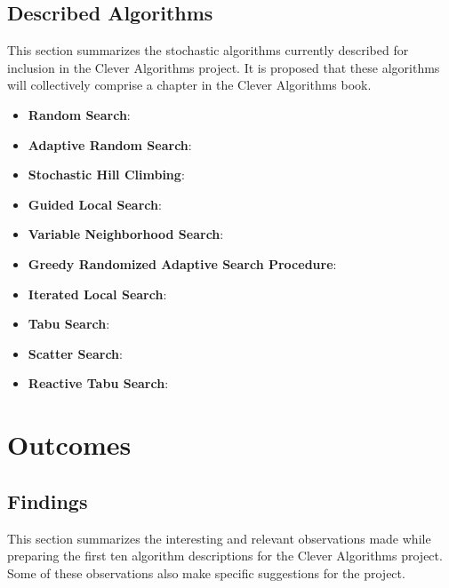 \documentclass[a4paper, 11pt]{article}
\begin{document}
% 
% 
\subsection{Described Algorithms}
\label{subsec:algorithms}
This section summarizes the stochastic algorithms currently described for inclusion in the Clever Algorithms project. It is proposed that these algorithms will collectively comprise a chapter in the Clever Algorithms book. 

\begin{itemize}
	\item \textbf{Random Search}: \cite{Brownlee2010g}
	\item \textbf{Adaptive Random Search}: \cite{Brownlee2010h}
	\item \textbf{Stochastic Hill Climbing}: \cite{Brownlee2010i}
	\item \textbf{Guided Local Search}: \cite{Brownlee2010j}
	\item \textbf{Variable Neighborhood Search}: \cite{Brownlee2010e}
	\item \textbf{Greedy Randomized Adaptive Search Procedure}: \cite{Brownlee2010d}
	\item \textbf{Iterated Local Search}: \cite{Brownlee2010k}
	\item \textbf{Tabu Search}: \cite{Brownlee2010f}
	\item \textbf{Scatter Search}: \cite{Brownlee2010l}
	\item \textbf{Reactive Tabu Search}: \cite{Brownlee2010m}
\end{itemize}

% 
% 
\section{Outcomes}
\label{sec:outcomes}

% 
% 
\subsection{Findings}
This section summarizes the interesting and relevant observations made while preparing the first ten algorithm descriptions for the Clever Algorithms project. Some of these observations also make specific suggestions for the project. 
\end{document}
